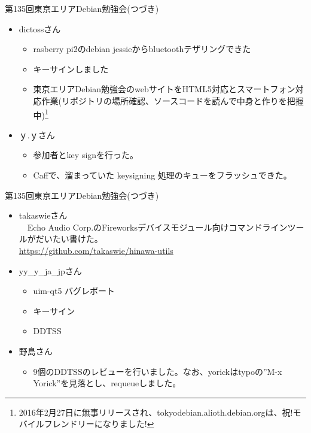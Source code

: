\begin{frame}{第135回東京エリアDebian勉強会(つづき)}

\begin{itemize}
\item dictossさん \\
  \begin{itemize}
  \item rasberry pi2のdebian jessieからbluetoothテザリングできた
  \item キーサインしました
  \item 東京エリアDebian勉強会のwebサイトをHTML5対応とスマートフォン対応作業(リポジトリの場所確認、ソースコードを読んで中身と作りを把握中)\footnote{2016年2月27日に無事リリースされ、tokyodebian.alioth.debian.orgは、祝!モバイルフレンドリーになりました!}
  \end{itemize}
\item ｙ.ｙさん
  \begin{itemize}
   \item 参加者とkey signを行った。
   \item Caffで、溜まっていた keysigning 処理のキューをフラッシュできた。
  \end{itemize}
\end{itemize}
\end{frame}

\begin{frame}{第135回東京エリアDebian勉強会(つづき)}

\begin{itemize}
\item takaswieさん\\
　Echo Audio Corp.のFireworksデバイスモジュール向けコマンドラインツールがだいたい書けた。\\
\url{https://github.com/takaswie/hinawa-utils}
\item  yy\_y\_ja\_jpさん\\
  \begin{itemize}
  \item uim-qt5 バグレポート
  \item キーサイン
  \item DDTSS
  \end{itemize}
\item 野島さん
  \begin{itemize}
  \item 9個のDDTSSのレビューを行いました。なお、yorickはtypoの''M-x Yorick''を見落とし、requeueしました。
  \end{itemize}
  
\end{itemize}
\end{frame}

